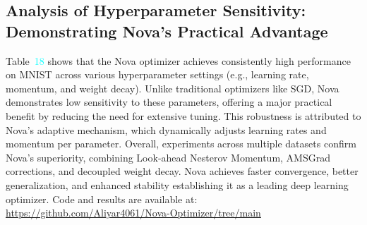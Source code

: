 \documentclass[10pt,twocolumn]{article}
\begin{document}
\subsection{Analysis of Hyperparameter Sensitivity: Demonstrating Nova's Practical Advantage}


Table~\textcolor{cyan}{18} shows that the Nova optimizer achieves consistently high performance on MNIST across various hyperparameter settings (e.g., learning rate, momentum, and weight decay). Unlike traditional optimizers like SGD, Nova demonstrates low sensitivity to these parameters, offering a major practical benefit by reducing the need for extensive tuning. This robustness is attributed to Nova’s adaptive mechanism, which dynamically adjusts learning rates and momentum per parameter. Overall, experiments across multiple datasets confirm Nova’s superiority, combining Look-ahead Nesterov Momentum, AMSGrad corrections, and decoupled weight decay. Nova achieves faster convergence, better generalization, and enhanced stability establishing it as a leading deep learning optimizer. Code and results are available at: \url{https://github.com/Aliyar4061/Nova-Optimizer/tree/main}
\end{document}
